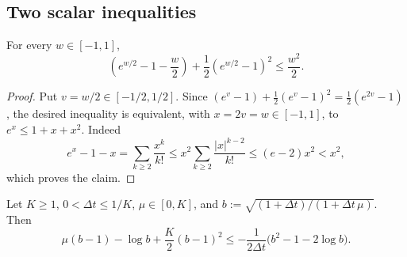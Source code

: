 \subsection{Two scalar inequalities}

\begin{lemma}\label{lem:scalar-retraction}
    For every $w\in[-1,1]$,
    \begin{equation*}
        \left(e^{w/2}-1-\frac w2\right)+\frac12\left(e^{w/2}-1\right)^2
        \leq\frac{w^2}2 .
    \end{equation*}
\end{lemma}

\begin{proof}
    Put $v=w/2\in[-1/2,1/2]$. Since
    $(e^v-1)+\tfrac12(e^v-1)^2=\tfrac12(e^{2v}-1)$, the desired inequality is equivalent, with
    $x=2v=w\in[-1,1]$, to $e^x\leq1+x+x^2$. Indeed
    \begin{equation*}
        e^x-1-x=\sum_{k\geq2}\frac{x^k}{k!}
        \leq x^2\sum_{k\geq2}\frac{|x|^{k-2}}{k!}
        \leq(e-2)x^2<x^2,
    \end{equation*}
    which proves the claim.
\end{proof}

\begin{lemma}\label{lem:scalar-KL}
    Let $K\geq1$, $0<\Delta t\leq1/K$, $\mu\in[0,K]$, and
    $b:=\sqrt{(1+\Delta t)/(1+\Delta t\,\mu)}$. Then
    \begin{equation}\label{eq:scalar-KL}
        \mu(b-1)-\log b+\frac K2(b-1)^2
        \leq
        -\frac1{2\Delta t}\bigl(b^2-1-2\log b\bigr).
    \end{equation}
\end{lemma}

